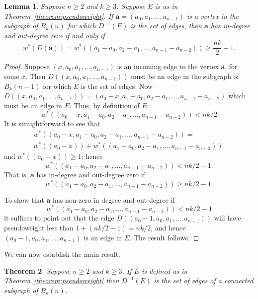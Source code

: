 \documentclass[a4paper,11pt]{article}
\newtheorem{lemma}{Lemma}[section]
\newtheorem{theorem}[lemma]{Theorem}
\begin{document}
\begin{lemma}  \label{lemma:degree-zero}
Suppose $n\geq2$ and $k\geq 3$. Suppose $E$ is as in Theorem~\ref{theorem:pseudoweight}. If
$\mathbf{a}=(a_0,a_1,\ldots,a_{n-1})$ is a vertex in the subgraph of $B_k(n)$ for which
$D^{-1}(E)$
is the set of edges, then $\mathbf{a}$ has in-degree and out-degree zero if and only if
\[ w^*(D(\mathbf{a}))=w^*((a_{1}-a_0,a_{2}-a_1,\ldots,a_{n-1}-a_{n-2}))\geq \frac{nk}{2}-1. \]
\end{lemma}

\begin{proof}
Suppose $(x,a_0,a_1,\ldots,a_{n-1})$ is an incoming edge to the vertex $\mathbf{a}$, for some $x$.
Then $D((x,a_0,a_1,\ldots,a_{n-1}))$ must be an edge in the subgraph of $B_k(n-1)$ for which $E$
is
the set of edges. Now
$D((x,a_0,a_1,\ldots,a_{n-1}))=(a_0-x,a_{1}-a_0,a_{2}-a_1,\ldots,a_{n-1}-a_{n-2})$ which must be
an
edge in $E$.  Thus, by definition of $E$:
\[ w^*((a_0-x,a_{1}-a_0,a_{2}-a_1,\ldots,a_{n-1}-a_{n-2}))< nk/2 \]
It is straightforward to see that
\begin{align*}
w^*((a_0-x,a_{1}-a_0,a_{2}-a_1,\ldots,a_{n-1}-a_{n-2})) =\\
w^*((a_0-x))+w^*((a_{1}-a_0,a_{2}-a_1,\ldots,a_{n-1}-a_{n-2})).
\end{align*}
and $w^*((a_0-x))\geq 1$; hence
\[ w^*((a_{1}-a_0,a_{2}-a_1,\ldots,a_{n-1}-a_{n-2}))< nk/2-1. \]
That is, $\mathbf{a}$ has in-degree and out-degree zero if
\[ w^*((a_{1}-a_0,a_{2}-a_1,\ldots,a_{n-1}-a_{n-2}))\geq nk/2-1. \]

To show that $\mathbf{a}$ has non-zero in-degree and out-degree if
\[ w^*((a_{1}-a_0,a_{2}-a_1,\ldots,a_{n-1}-a_{n-2}))< nk/2-1 \]
it suffices to point out that the edge $D((a_0-1,a_0,a_1,\ldots,a_{n-1}))$ will have pseudoweight
less than $1+(nk/2-1)=nk/2$, and hence $(a_0-1,a_0,a_1,\ldots,a_{n-1})$ is an edge in $E$.  The
result follows.
\end{proof}

We can now establish the main result.

\begin{theorem}  \label{theorem:D-1E_connected}
Suppose $n\geq2$ and $k\geq 3$. If $E$ is defined as in Theorem~\ref{theorem:pseudoweight} then
$D^{-1}(E)$ is the set of edges of a connected subgraph of $B_{k}(n)$.
\end{theorem}
\end{document}
